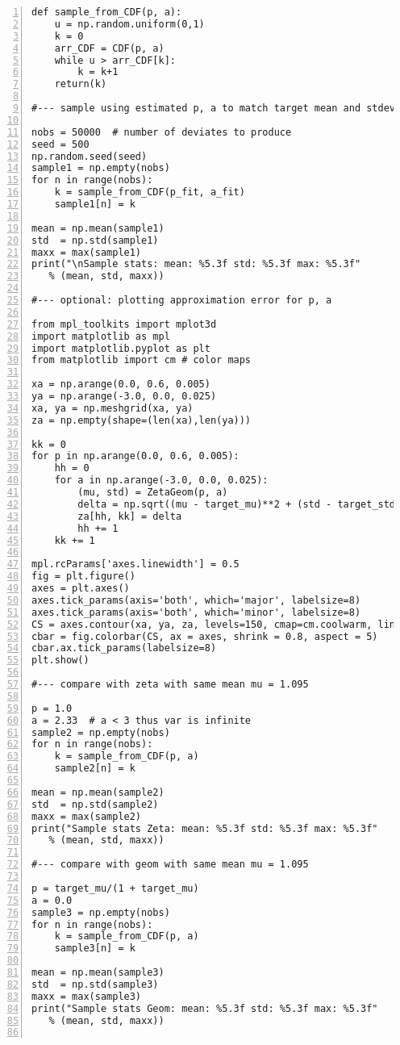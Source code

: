\documentclass[oneside,10pt]{book}
\begin{document}
\begin{lstlisting}[numbers=left]
def sample_from_CDF(p, a):
    u = np.random.uniform(0,1)
    k = 0
    arr_CDF = CDF(p, a)
    while u > arr_CDF[k]:
        k = k+1
    return(k)

#--- sample using estimated p, a to match target mean and stdev

nobs = 50000  # number of deviates to produce
seed = 500
np.random.seed(seed)
sample1 = np.empty(nobs)
for n in range(nobs):
    k = sample_from_CDF(p_fit, a_fit)
    sample1[n] = k

mean = np.mean(sample1)
std  = np.std(sample1)
maxx = max(sample1)
print("\nSample stats: mean: %5.3f std: %5.3f max: %5.3f" 
   % (mean, std, maxx))

#--- optional: plotting approximation error for p, a 

from mpl_toolkits import mplot3d
import matplotlib as mpl
import matplotlib.pyplot as plt
from matplotlib import cm # color maps

xa = np.arange(0.0, 0.6, 0.005)
ya = np.arange(-3.0, 0.0, 0.025)
xa, ya = np.meshgrid(xa, ya)
za = np.empty(shape=(len(xa),len(ya)))

kk = 0
for p in np.arange(0.0, 0.6, 0.005):
    hh = 0
    for a in np.arange(-3.0, 0.0, 0.025):
        (mu, std) = ZetaGeom(p, a)
        delta = np.sqrt((mu - target_mu)**2 + (std - target_std)**2)
        za[hh, kk] = delta
        hh += 1
    kk += 1

mpl.rcParams['axes.linewidth'] = 0.5
fig = plt.figure() 
axes = plt.axes()
axes.tick_params(axis='both', which='major', labelsize=8)
axes.tick_params(axis='both', which='minor', labelsize=8)
CS = axes.contour(xa, ya, za, levels=150, cmap=cm.coolwarm, linewidths=0.35)
cbar = fig.colorbar(CS, ax = axes, shrink = 0.8, aspect = 5)
cbar.ax.tick_params(labelsize=8)
plt.show()

#--- compare with zeta with same mean mu = 1.095

p = 1.0
a = 2.33  # a < 3 thus var is infinite
sample2 = np.empty(nobs)
for n in range(nobs):
    k = sample_from_CDF(p, a)
    sample2[n] = k

mean = np.mean(sample2)
std  = np.std(sample2)
maxx = max(sample2)
print("Sample stats Zeta: mean: %5.3f std: %5.3f max: %5.3f" 
   % (mean, std, maxx))

#--- compare with geom with same mean mu = 1.095

p = target_mu/(1 + target_mu)
a = 0.0
sample3 = np.empty(nobs)
for n in range(nobs):
    k = sample_from_CDF(p, a)
    sample3[n] = k

mean = np.mean(sample3)
std  = np.std(sample3)
maxx = max(sample3)
print("Sample stats Geom: mean: %5.3f std: %5.3f max: %5.3f" 
   % (mean, std, maxx))


\end{lstlisting}
\end{document}
